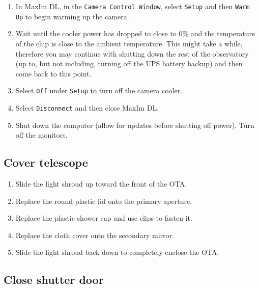 \documentclass{article}
\begin{document}
	\begin{enumerate}
		
		\item In MaxIm DL, in the \texttt{Camera Control Window}, select \texttt{Setup} and then \texttt{Warm Up} to begin warming up the camera.
		
		\item Wait until the cooler power has dropped to close to 0\% and the temperature of the chip is close to the ambient temperature. This might take a while, therefore you may continue with shutting down the rest of the observatory (up to, but not including, turning off the UPS battery backup) and then come back to this point.
		
		\item Select \texttt{Off} under \texttt{Setup} to turn off the camera cooler.
		
		\item Select \texttt{Disconnect} and then close MaxIm DL.
		
		\item Shut down the computer (allow for updates before shutting off power). Turn off the monitors.
		
	\end{enumerate}
	
	\subsection{Cover telescope}
	\label{sec:cover-telescope}
	
	\begin{enumerate}
		
		\item Slide the light shroud up toward the front of the OTA.
		
		\item Replace the round plastic lid onto the primary aperture.
		
		\item Replace the plastic shower cap and use clips to fasten it.
		
		\item Replace the cloth cover onto the secondary mirror.
		
		\item Slide the light shroud back down to completely enclose the OTA.
		
	\end{enumerate}
	
	\subsection{Close shutter door}
	\label{sec:close-shutter-door}
	
\end{document}
